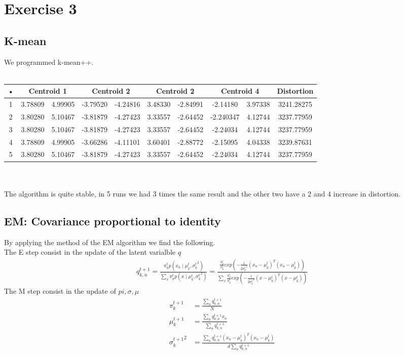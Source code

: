 \documentclass[a4paper]{article}
\begin{document}
\section{Exercise 3}
\subsection{K-mean}
We programmed k-mean++.\\\\
\begin{tabular}{|c|c|c|c|c|c|c|c|c|c|}
\hline 
• & \multicolumn{2}{c|}{Centroid 1} & \multicolumn{2}{c|}{Centroid 2} & \multicolumn{2}{c|}{Centroid 2} & \multicolumn{2}{c|}{Centroid 4} & Distortion \\ 
\hline 
1 & 3.78809 & 4.99905 & -3.79520 & -4.24816 &  3.48330 & -2.84991 & -2.14180 & 3.97338 & 3241.28275 \\ 
\hline 
2 &  3.80280 & 5.10467 & -3.81879 & -4.27423 & 3.33557 & -2.64452 & -2.240347  & 4.12744 & 3237.77959 \\ 
\hline 
3 &  3.80280 & 5.10467 & -3.81879 & -4.27423 & 3.33557 & -2.64452 & -2.24034 & 4.12744 & 3237.77959 \\ 
\hline 
4 &  3.78809 & 4.99905 & -3.66286 & -4.11101 & 3.60401 & -2.88772 & -2.15095 & 4.04338 & 3239.87631 \\ 
\hline
5 &  3.80280 & 5.10467 & -3.81879 & -4.27423 & 3.33557 & -2.64452 & -2.24034 & 4.12744 & 3237.77959 \\ 
\hline 
\end{tabular}
\\\\
The algorithm is quite stable, in 5 runs we had 3 times the same result and the other two have a 2 and 4 increase in distortion.
\subsection{EM: Covariance proportional to identity}
By applying the method of the EM algorithm we find the following.\\
The E step consist in the update of the latent varialble $q$
\begin{align*}
q^{t+1}_{k,n} = \frac{\pi_k^t p(x_n \mid \mu_k^t, {\sigma_k^t}^2)}{\sum_{x} \pi_k^t p(x \mid \mu_k^t, {\sigma_k^t}^2)} =
\frac{\frac{\pi_k^t}{\sigma_k^t} exp(-\frac{1}{2{\sigma_k^t}^2}(x_n-\mu_k^t)^T(x_n - \mu_k^t))}{\sum_{x} \frac{\pi_k^t}{\sigma_k^t} exp(-\frac{1}{2{\sigma_k^t}^2}(x-\mu_k^t)^T(x-\mu_k^t))}
\end{align*}
The M step consist in the update of $pi, \sigma, \mu$
\begin{align*}
\pi_k^{t+1} &= \frac{\sum_n q^{t+1}_{k,n}}{N} \\
\mu_k^{t+1} &= \frac{\sum_n q^{t+1}_{k,n}x_n}{\sum_n q^{t+1}_{k,n}}\\
{\sigma_k^{t+1}}^2 &= \frac{\sum_n q^{t+1}_{k,n}(x_n-\mu_k^t)^T(x_n - \mu_k^t)}{d\sum_n q^{t+1}_{k,n}}
\end{align*}
\end{document}
